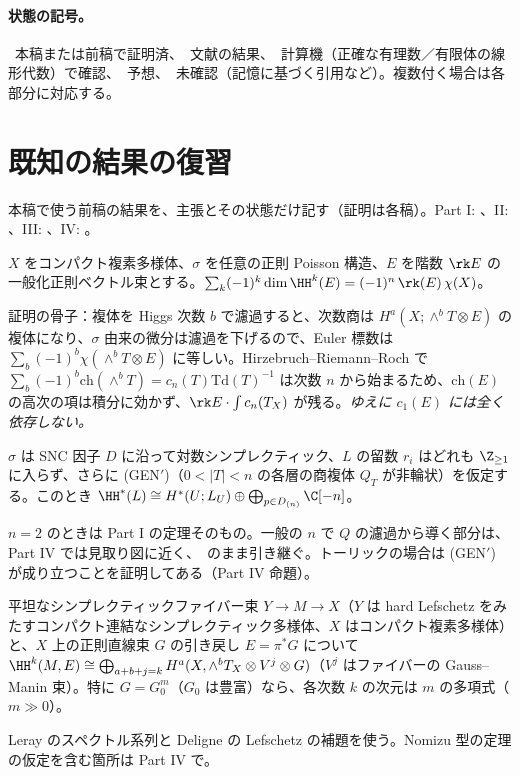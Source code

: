\paragraph{状態の記号。}\tP\ 本稿または前稿で証明済、\tC\ 文献の結果、\tV\ 計算機（正確な有理数／有限体の線形代数）で確認、\tK\ 予想、\tQ\ 未確認（記憶に基づく引用など）。複数付く場合は各部分に対応する。

\section{既知の結果の復習}\label{sec:recall}
本稿で使う前稿の結果を、主張とその状態だけ記す（証明は各稿）。Part I: \cite{PartI}、II: \cite{PartII}、III: \cite{PartIII}、IV: \cite{PartIV}。

\begin{thm}\label{thm:E}
$X$ をコンパクト複素多様体、$\sigma$ を任意の正則 Poisson 構造、$E$ を階数 $\rk E$ の一般化正則ベクトル束とする。$\sum_k(-1)^k\dim\HH^k(E)=(-1)^n\,\rk(E)\,\chi(X)$。
\end{thm}
証明の骨子：複体を Higgs 次数 $b$ で濾過すると、次数商は $H^a(X;\wedge^bT\otimes E)$ の複体になり、$\sigma$ 由来の微分は濾過を下げるので、Euler 標数は $\sum_b(-1)^b\chi(\wedge^bT\otimes E)$ に等しい。Hirzebruch--Riemann--Roch で $\sum_b(-1)^b\mathrm{ch}(\wedge^bT)=c_n(T)\mathrm{Td}(T)^{-1}$ は次数 $n$ から始まるため、$\mathrm{ch}(E)$ の高次の項は積分に効かず、$\rk E\cdot\int c_n(T_X)$ が残る。\emph{ゆえに $c_1(E)$ には全く依存しない。}

\begin{thm}\label{thm:R}
$\sigma$ は SNC 因子 $D$ に沿って対数シンプレクティック、$L$ の留数 $r_i$ はどれも $\Z_{\ge1}$ に入らず、さらに (GEN$'$)（$0<|T|<n$ の各層の商複体 $Q_T$ が非輪状）を仮定する。このとき $\HH^*(L)\cong H^*(U;L_U)\oplus\bigoplus_{p\in D_{(n)}}\C[-n]$。
\end{thm}
$n=2$ のときは Part I の定理そのもの。一般の $n$ で $Q$ の濾過から導く部分は、Part IV では見取り図に近く、\tQ\ のまま引き継ぐ。トーリックの場合は (GEN$'$) が成り立つことを証明してある（Part IV 命題）。

\begin{thm}\label{thm:L}
平坦なシンプレクティックファイバー束 $Y\to M\to X$（$Y$ は hard Lefschetz をみたすコンパクト連結なシンプレクティック多様体、$X$ はコンパクト複素多様体）と、$X$ 上の正則直線束 $G$ の引き戻し $E=\pi^*G$ について $\HH^k(M,E)\cong\bigoplus_{a+b+j=k}H^a(X,\wedge^bT_X\otimes V^j\otimes G)$（$V^j$ はファイバーの Gauss--Manin 束）。特に $G=G_0^m$（$G_0$ は豊富）なら、各次数 $k$ の次元は $m$ の多項式（$m\gg0$）。
\end{thm}
Leray のスペクトル系列と Deligne の Lefschetz の補題を使う。Nomizu 型の定理の仮定を含む箇所は Part IV で\tQ。

